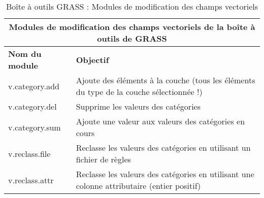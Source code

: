 \begin{table}[H]
\centering
 \begin{tabular}{|p{4cm}|p{10cm}|}
  \hline \multicolumn{2}{|c|}{\textbf{Modules de modification des champs vectoriels de la boîte à outils de GRASS}} \\
  \hline \textbf{Nom du module} & \textbf{Objectif} \\
  \hline v.category.add & Ajoute des éléments à la couche (tous les éléments du type de la couche sélectionnée !)\\
  \hline v.category.del & Supprime les valeurs des catégories\\
  \hline v.category.sum & Ajoute une valeur aux valeurs des catégories en cours\\
  \hline v.reclass.file & Reclasse les valeurs des catégories en utilisant un fichier de règles\\
  \hline v.reclass.attr & Reclasse les valeurs des catégories en utilisant une colonne attributaire (entier positif)\\
\hline
\end{tabular}
\caption{Boîte à outils GRASS : Modules de modification des champs vectoriels}
\end{table}

